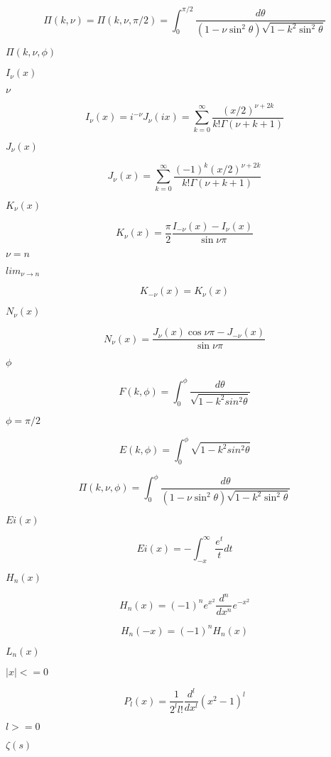 \documentclass{article}
\begin{document}
\[ \Pi(k,\nu) = \Pi(k,\nu,\pi/2) = \int_0^{\pi/2} \frac{d\theta} {(1 - \nu \sin^2\theta)\sqrt{1 - k^2 \sin^2\theta}} \]
\pagebreak

$ \Pi(k,\nu,\phi) $
\pagebreak

$ I_{\nu}(x) $
\pagebreak

$ \nu $
\pagebreak

\[ I_{\nu}(x) = i^{-\nu}J_\nu(ix) = \sum_{k=0}^{\infty} \frac{(x/2)^{\nu + 2k}}{k!\Gamma(\nu+k+1)} \]
\pagebreak

$ J_{\nu}(x) $
\pagebreak

\[ J_{\nu}(x) = \sum_{k=0}^{\infty} \frac{(-1)^k (x/2)^{\nu + 2k}}{k!\Gamma(\nu+k+1)} \]
\pagebreak

$ K_{\nu}(x) $
\pagebreak

\[ K_{\nu}(x) = \frac{\pi}{2} \frac{I_{-\nu}(x) - I_{\nu}(x)}{\sin \nu\pi} \]
\pagebreak

$ \nu = n $
\pagebreak

$ lim_{\nu \to n} $
\pagebreak

\[ K_{-\nu}(x) = K_{\nu}(x) \]
\pagebreak

$ N_{\nu}(x) $
\pagebreak

\[ N_{\nu}(x) = \frac{J_{\nu}(x) \cos \nu\pi - J_{-\nu}(x)} {\sin \nu\pi} \]
\pagebreak

$ \phi $
\pagebreak

\[ F(k,\phi) = \int_0^{\phi}\frac{d\theta} {\sqrt{1 - k^2 sin^2\theta}} \]
\pagebreak

$ \phi= \pi/2 $
\pagebreak

\[ E(k,\phi) = \int_0^{\phi} \sqrt{1 - k^2 sin^2\theta} \]
\pagebreak

\[ \Pi(k,\nu,\phi) = \int_0^{\phi} \frac{d\theta} {(1 - \nu \sin^2\theta) \sqrt{1 - k^2 \sin^2\theta}} \]
\pagebreak

$ Ei(x) $
\pagebreak

\[ Ei(x) = -\int_{-x}^\infty \frac{e^t}{t} dt \]
\pagebreak

$ H_n(x) $
\pagebreak

\[ H_n(x) = (-1)^n e^{x^2} \frac{d^n}{dx^n} e^{-x^2} \]
\pagebreak

\[ H_n(-x) = (-1)^n H_n(x) \]
\pagebreak

$ L_n(x) $
\pagebreak

$ |x| <= 0 $
\pagebreak

\[ P_l(x) = \frac{1}{2^l l!}\frac{d^l}{dx^l}(x^2 - 1)^{l} \]
\pagebreak

$ l >= 0 $
\pagebreak

$ \zeta(s) $
\pagebreak
\end{document}
